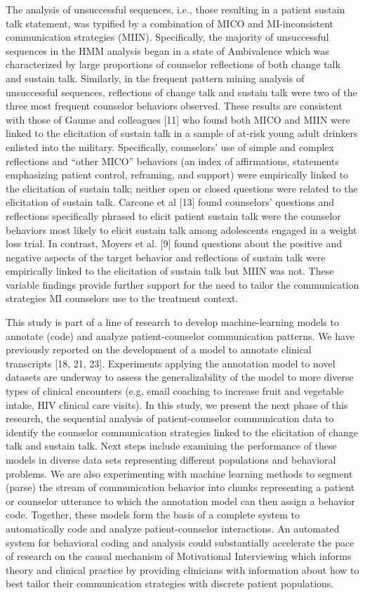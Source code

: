 The analysis of unsuccessful sequences, i.e., those resulting in a patient sustain talk statement, was typified by a combination of MICO and MI-inconsistent communication strategies (MIIN). Specifically, the majority of unsuccessful sequences in the HMM analysis began in a state of Ambivalence which was characterized by large proportions of counselor reflections of both change talk and sustain talk. Similarly, in the frequent pattern mining analysis of unsuccessful sequences, reflections of change talk and sustain talk were two of the three most frequent counselor behaviors observed. These results are consistent with those of Gaume and colleagues [11] who found both MICO and MIIN were linked to the elicitation of sustain talk in a sample of at-risk young adult drinkers enlisted into the military. Specifically, counselors’ use of simple and complex reflections and “other MICO” behaviors (an index of affirmations, statements emphasizing patient control, reframing, and support) were empirically linked to the elicitation of sustain talk; neither open or closed questions were related to the elicitation of sustain talk. Carcone et al [13] found counselors’ questions and reflections specifically phrased to elicit patient sustain talk were the counselor behaviors most likely to elicit sustain talk among adolescents engaged in a weight loss trial. In contrast, Moyers et al. [9] found questions about the positive and negative aspects of the target behavior and reflections of sustain talk were empirically linked to the elicitation of sustain talk but MIIN was not. These variable findings provide further support for the need to tailor the communication strategies MI counselors use to the treatment context. 

This study is part of a line of research to develop machine-learning models to annotate (code) and analyze patient-counselor communication patterns. We have previously reported on the development of a model to annotate clinical transcripts [18, 21, 23]. Experiments applying the annotation model to novel datasets are underway to assess the generalizability of the model to more diverse types of clinical encounters (e.g, email coaching to increase fruit and vegetable intake, HIV clinical care visits). In this study, we present the next phase of this research, the sequential analysis of patient-counselor communication data to identify the counselor communication strategies linked to the elicitation of change talk and sustain talk. Next steps include examining the performance of these models in diverse data sets representing different populations and behavioral problems. We are also experimenting with machine learning methods to segment (parse) the stream of communication behavior into chunks representing a patient or counselor utterance to which the annotation model can then assign a behavior code. Together, these models form the basis of a complete system to automatically code and analyze patient-counselor interactions. An automated system for behavioral coding and analysis could substantially accelerate the pace of research on the causal mechanism of Motivational Interviewing which informs theory and clinical practice by providing clinicians with information about how to best tailor their communication strategies with discrete patient populations.
 
